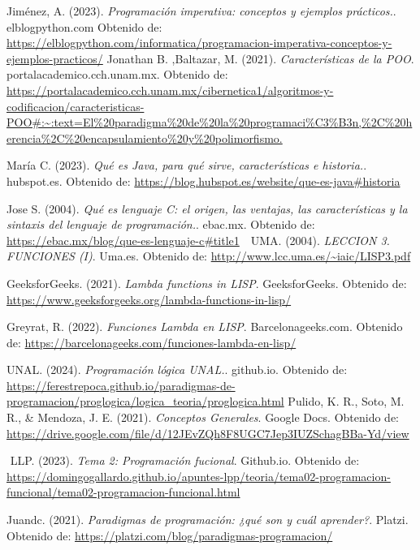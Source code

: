 \newpage
\begin{thebibliography}{}

Jiménez, A. (2023). \textit{Programación imperativa: conceptos y ejemplos prácticos.}. elblogpython.com Obtenido de: \url{https://elblogpython.com/informatica/programacion-imperativa-conceptos-y-ejemplos-practicos/}
‌
Jonathan B. ,Baltazar, M.  (2021). \textit{Características de la POO}. portalacademico.cch.unam.mx. Obtenido de: \url{https://portalacademico.cch.unam.mx/cibernetica1/algoritmos-y-codificacion/caracteristicas-POO#:~:text=El%20paradigma%20de%20la%20programaci%C3%B3n,%2C%20herencia%2C%20encapsulamiento%20y%20polimorfismo.}

María C. (2023). \textit{Qué es Java, para qué sirve, características e historia.}. hubspot.es. Obtenido de: \url{https://blog.hubspot.es/website/que-es-java#historia}
‌

Jose S. (2004). \textit{ Qué es lenguaje C: el origen, las ventajas, las características y la sintaxis del lenguaje de programación.}. ebac.mx. Obtenido de: \url{https://ebac.mx/blog/que-es-lenguaje-c#title1}
‌
‌
UMA. (2004). \textit{LECCION 3. FUNCIONES (I)}. Uma.es. Obtenido de: \url{http://www.lcc.uma.es/~iaic/LISP3.pdf}

GeeksforGeeks. (2021). \textit{Lambda functions in LISP}. GeeksforGeeks. Obtenido de: \url{https://www.geeksforgeeks.org/lambda-functions-in-lisp/}

Greyrat, R. (2022). \textit{Funciones Lambda en LISP}. Barcelonageeks.com. Obtenido de: \url{https://barcelonageeks.com/funciones-lambda-en-lisp/}

UNAL. (2024). \textit{Programación lógica UNAL.}. github.io. Obtenido de: \url{https://ferestrepoca.github.io/paradigmas-de-programacion/proglogica/logica_teoria/proglogica.html}
‌
Pulido, K. R., Soto, M. R., \& Mendoza, J. E. (2021). \textit{Conceptos Generales}. Google Docs. Obtenido de: \url{https://drive.google.com/file/d/12JEvZQh8F8UGC7Jep3IUZSchagBBa-Yd/view}


‌
LLP. (2023). \textit{Tema 2: Programación fucional}. 
Github.io. Obtenido de:
\url{https://domingogallardo.github.io/apuntes-lpp/teoria/tema02-programacion-funcional/tema02-programacion-funcional.html}

Juandc. (2021). \textit{Paradigmas de programación: ¿qué son y cuál aprender?}. Platzi. Obtenido de: \url{https://platzi.com/blog/paradigmas-programacion/}

\end{thebibliography}

